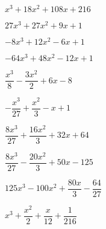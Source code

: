 \begin{esercizio}
\begin{htmulticols}{2}
\begin{enumeratea}
\item \(x^{3} + 18 x^{2} + 108 x + 216\) %
\item \(27 x^{3} + 27 x^{2} + 9 x + 1\) %
\item \(- 8 x^{3} + 12 x^{2} - 6 x + 1\) %
\item \(- 64 x^{3} + 48 x^{2} - 12 x + 1\) %
\item \(\dfrac{x^{3}}{8} - \dfrac{3 x^{2}}{2} + 6 x - 8\) %
\item \(- \dfrac{x^{3}}{27} + \dfrac{x^{2}}{3} - x + 1\) %
\item \(\dfrac{8 x^{3}}{27} + \dfrac{16 x^{2}}{3} + 32 x + 64\) %
\item \(\dfrac{8 x^{3}}{27} - \dfrac{20 x^{2}}{3} + 50 x - 125\) %
\item \(125 x^{3} - 100 x^{2} + \dfrac{80 x}{3} - \dfrac{64}{27}\) %
\item \(x^{3} + \dfrac{x^{2}}{2} + \dfrac{x}{12} + \dfrac{1}{216}\) %

\end{enumeratea}
\end{htmulticols}
\end{esercizio}
